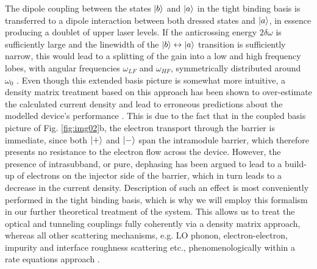 \documentclass[journal]{IEEEtran}
\def\dw{\delta\omega}
\begin{document}
The dipole coupling between the states $\ket{b}$ and $\ket{a}$ in the tight binding basis is transferred to a dipole interaction between both dressed states and $\ket{a}$, in essence producing a doublet of upper laser levels. If the anticrossing energy $2\dw$ is sufficiently large and the linewidth of the $\ket{b}\leftrightarrow\ket{a}$ transition is sufficiently narrow, this would lead to a splitting of the gain into a low and high frequency lobes, with angular frequencies $\omega_{LF}$ and $\omega_{HF}$, symmetrically distributed around $\omega_0$ \cite{dupont2010simplified}. Even though this extended basis picture is somewhat more intuitive, a density matrix treatment based on this approach has been shown to over-estimate the calculated current density and lead to erroneous predictions about the modelled device's performance \cite{callebaut2005importance}. This is due to the fact that in the coupled basis picture of Fig. \ref{fig:img02}b, the electron transport through the barrier is immediate, since both $\ket{+}$ and $\ket{-}$ span the intramodule barrier, which therefore presents no resistance to the electron flow across the device. However, the presence of intrasubband, or pure, dephasing has been argued to lead to a build-up of electrons on the injector side of the barrier, which in turn leads to a decrease in the current density. Description of such an effect is most conveniently performed in the tight binding basis, which is why we will employ this formalism in our further theoretical treatment of the system. This allows us to treat the optical and tunneling couplings fully coherently via a density matrix approach, whereas all other scattering mechanisms, e.g. LO phonon, electron-electron, impurity and interface roughness scattering etc., phenomenologically within a rate equations approach \cite{kumar2009coherence}. 
\end{document}
